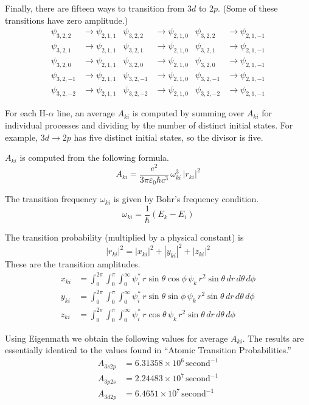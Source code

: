 \documentclass[12pt]{article}
\begin{document}
Finally, there are fifteen ways to transition from $3d$ to $2p$.
(Some of these transitions have zero amplitude.)
\begin{align*}
\psi_{3,2,2}&\rightarrow\psi_{2,1,1} &
\psi_{3,2,2}&\rightarrow\psi_{2,1,0} &
\psi_{3,2,2}&\rightarrow\psi_{2,1,-1}
\\
\psi_{3,2,1}&\rightarrow\psi_{2,1,1} &
\psi_{3,2,1}&\rightarrow\psi_{2,1,0} &
\psi_{3,2,1}&\rightarrow\psi_{2,1,-1}
\\
\psi_{3,2,0}&\rightarrow\psi_{2,1,1} &
\psi_{3,2,0}&\rightarrow\psi_{2,1,0} &
\psi_{3,2,0}&\rightarrow\psi_{2,1,-1}
\\
\psi_{3,2,-1}&\rightarrow\psi_{2,1,1} &
\psi_{3,2,-1}&\rightarrow\psi_{2,1,0} &
\psi_{3,2,-1}&\rightarrow\psi_{2,1,-1}
\\
\psi_{3,2,-2}&\rightarrow\psi_{2,1,1} &
\psi_{3,2,-2}&\rightarrow\psi_{2,1,0} &
\psi_{3,2,-2}&\rightarrow\psi_{2,1,-1}
\end{align*}

For each H-$\alpha$ line, an average $A_{ki}$ is computed by summing over $A_{ki}$ for individual processes
and dividing by the number of distinct initial states.
For example, $3d\rightarrow2p$ has five distinct initial states, so the divisor is five.

\bigskip
$A_{ki}$ is computed from the following formula.
\begin{equation*}
A_{ki}=\frac{e^2}{3\pi\varepsilon_0\hbar c^3}\,\omega_{ki}^3\,|r_{ki}|^2
\end{equation*}

The transition frequency $\omega_{ki}$ is given by Bohr's frequency condition.
\begin{equation*}
\omega_{ki}=\frac{1}{\hbar}(E_k-E_i)
\end{equation*}

The transition probability (multiplied by a physical constant) is
\begin{equation*}
|r_{ki}|^2
=|x_{ki}|^2
+|y_{ki}|^2
+|z_{ki}|^2
\end{equation*}
These are the transition amplitudes.
\begin{align*}
x_{ki}&=\int_0^{2\pi}\int_0^\pi\int_0^\infty
\psi_i^*\,r\sin\theta\cos\phi\,\psi_k
\,r^2\sin\theta\,dr\,d\theta\,d\phi
\\
y_{ki}&=\int_0^{2\pi}\int_0^\pi\int_0^\infty
\psi_i^*\,r\sin\theta\sin\phi\,\psi_k
\,r^2\sin\theta\,dr\,d\theta\,d\phi
\\
z_{ki}&=\int_0^{2\pi}\int_0^\pi\int_0^\infty
\psi_i^*\,r\cos\theta\,\psi_k
\,r^2\sin\theta\,dr\,d\theta\,d\phi
\end{align*}

Using Eigenmath we obtain the following values for average $A_{ki}$.
The results are essentially identical to the values found in ``Atomic Transition Probabilities.''
\begin{align*}
A_{3s2p}&=6.31358\times10^6\,\text{second}^{-1}
\\
A_{3p2s}&=2.24483\times10^7\,\text{second}^{-1}
\\
A_{3d2p}&=6.4651\times10^7\,\text{second}^{-1}
\end{align*}
\end{document}
